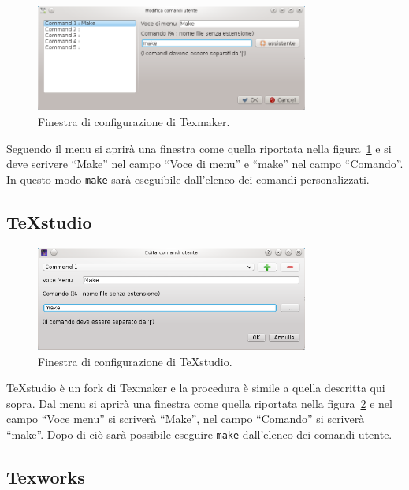 \begin{figure}
  \centering
  \includegraphics[width=0.8\textwidth]{figure/texmaker}
  \caption{Finestra di configurazione di Texmaker.}
  \label{fig:texmaker}
\end{figure}
Seguendo il menu
 si aprirà una
finestra come quella riportata nella figura~\ref{fig:texmaker} e si deve
scrivere ``Make'' nel campo ``Voce di menu'' e ``make'' nel campo ``Comando''.
In questo modo \texttt{make} sarà eseguibile dall'elenco dei comandi
personalizzati.

\subsection{TeXstudio}
\label{sec:texstudio}

\begin{figure}
  \centering
  \includegraphics[width=0.8\textwidth]{figure/texstudio}
  \caption{Finestra di configurazione di TeXstudio.}
  \label{fig:texstudio}
\end{figure}
TeXstudio è un fork di Texmaker e la procedura è simile a quella descritta qui
sopra.  Dal menu  si aprirà
una finestra come quella riportata nella figura~\ref{fig:texstudio} e nel campo
``Voce menu'' si scriverà ``Make'', nel campo ``Comando'' si scriverà ``make''.
Dopo di ciò sarà possibile eseguire \texttt{make} dall'elenco dei comandi
utente.

\subsection{Texworks}
\label{sec:texworks}

